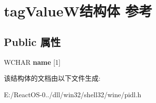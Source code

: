 \hypertarget{structtag_value_w}{}\section{tag\+Value\+W结构体 参考}
\label{structtag_value_w}
\subsection*{Public 属性}
\begin{DoxyCompactItemize}
\item 
\mbox{\label{structtag_value_w_ab61c043b9f6e704c40e5f452c5df5d91}} 
W\+C\+H\+AR {\bfseries name} \mbox{[}1\mbox{]}
\end{DoxyCompactItemize}


该结构体的文档由以下文件生成\+:\begin{DoxyCompactItemize}
\item 
E\+:/\+React\+O\+S-\/0../dll/win32/shell32/wine/pidl.\+h\end{DoxyCompactItemize}
